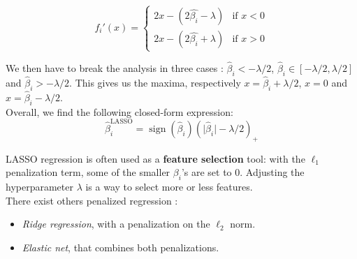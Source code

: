 $$f_i'(x) = \left\{
    \begin{array}{ll}
        2x-(2\hat{\beta_i}-\lambda) & \mbox{if } x<0 \\
        2x-(2\hat{\beta_i}+\lambda) & \mbox{if } x>0
    \end{array}
\right.$$

We then have to break the analysis in three cases : $\hat{\beta}_i < -\lambda/2$, $ \hat{\beta}_i \in [-\lambda/2, \lambda/2]$ and $\hat{\beta}_i > -\lambda/2$. This gives us the maxima, respectively $x = \hat{\beta}_i + \lambda/2$, $x=0$ and $x = \hat{\beta}_i - \lambda/2$.\\

Overall, we find the following closed-form expression: $$\hat{\beta}_i^{\text{LASSO}} = \operatorname{sign}(\hat{\beta}_i)(\lvert \hat{\beta}_i \rvert - \lambda/2)_{+}$$

LASSO regression is often used as a \textbf{feature selection} tool: with the $\ell_1$ penalization term, some of the smaller $\beta_i$'s are set to 0. Adjusting the hyperparameter $\lambda$ is a way to select more or less features.\\ 

There exist others penalized regression :
\begin{itemize}
    \item \textit{Ridge regression}, with a penalization on the $\ell_2$ norm.
    \item \textit{Elastic net}, that combines both penalizations.
\end{itemize}
